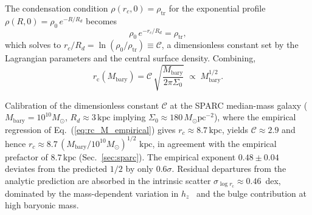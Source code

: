 \documentclass[%
    aps,
    prd,
    reprint,
    superscriptaddress,
    nofootinbib,
    floatfix,
    amsmath,amssymb,
]{revtex4-2}
\newcommand{\Msun}{M_{\odot}}
\newcommand{\Mbary}{M_{\mathrm{bary}}}
\newcommand{\rc}{r_{\mathrm{c}}}
\newcommand{\kpc}{\,\mathrm{kpc}}
\begin{document}
The condensation condition $\rho(r_{c},0)=\rho_{\mathrm{tr}}$ for
the exponential profile $\rho(R,0)=\rho_{0}\,e^{-R/R_{d}}$ becomes
\begin{equation}
\rho_{0}\, e^{-r_{c}/R_{d}} = \rho_{\mathrm{tr}},
\end{equation}
which solves to $r_{c}/R_{d} = \ln(\rho_{0}/\rho_{\mathrm{tr}})
\equiv \mathcal{C}$, a dimensionless constant set by the
Lagrangian parameters and the central surface density. Combining,
\begin{equation}
\label{eq:rc_M_derivation}
\rc(\Mbary) = \mathcal{C}\,\sqrt{\frac{\Mbary}{2\pi\Sigma_{0}}}
            \;\propto\; \Mbary^{1/2}.
\end{equation}

Calibration of the dimensionless constant $\mathcal{C}$ at the
SPARC median-mass galaxy ($\Mbary=10^{10}\Msun$, $R_{d}\approx 3\kpc$
implying $\Sigma_{0}\approx 180\,\Msun\mathrm{pc}^{-2}$), where the
empirical regression of Eq.~(\ref{eq:rc_M_empirical}) gives
$r_{c}\!\approx\!8.7\kpc$, yields $\mathcal{C}\approx 2.9$ and
hence $r_{c}\approx 8.7\,(\Mbary/10^{10}\Msun)^{1/2}\,\kpc$, in
agreement with the empirical prefactor of $8.7\kpc$
(Sec.~\ref{sec:sparc}). The empirical exponent
$0.48\pm 0.04$ deviates from the predicted $1/2$ by only
$0.6\sigma$. Residual departures from the analytic prediction
are absorbed in the intrinsic scatter
$\sigma_{\log\rc}\!\approx\!0.46$~dex, dominated by the
mass-dependent variation in $h_{z}$~\cite{Bizyaev2014} and the
bulge contribution at high baryonic mass.



\end{document}
